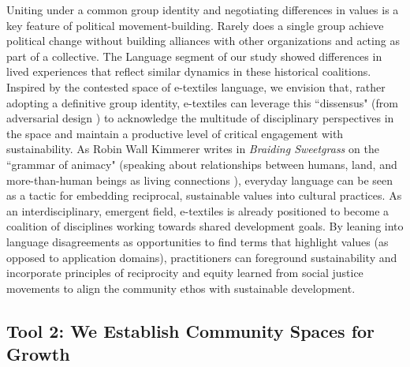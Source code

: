 Uniting under a common group identity and negotiating differences in values is a key feature of political movement-building. Rarely does a single group achieve political change without building alliances with other organizations \cite{post_multi-organizational_2015} and acting as part of a collective. The Language segment of our study showed differences in lived experiences that reflect similar dynamics in these historical coalitions. 
Inspired by the contested space of e-textiles language, we envision that, rather adopting a definitive group identity, e-textiles can leverage this ``dissensus" (from adversarial design \cite{disalvo_adversarial_2015}) to acknowledge the multitude of disciplinary perspectives in the space and maintain a productive level of critical engagement with sustainability. As Robin Wall Kimmerer writes in \textit{Braiding Sweetgrass} on the ``grammar of animacy" (speaking about relationships between humans, land, and more-than-human beings as living connections \cite{kimmerer_braiding_2015}), everyday language can be seen as a tactic for embedding reciprocal, sustainable values into cultural practices. As an interdisciplinary, emergent field, e-textiles is already positioned to become a coalition of disciplines working towards shared development goals. %
By leaning into language disagreements as opportunities to find terms that highlight values (as opposed to application domains),
practitioners can foreground sustainability and incorporate principles of reciprocity and equity learned from social justice movements to align the community ethos with sustainable development.

\subsection{Tool 2: We Establish Community Spaces for Growth}

